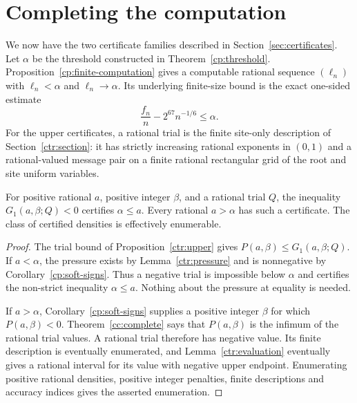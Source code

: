 \section{Completing the computation}\label{sec:assembly}

We now have the two certificate families described in
Section~\ref{sec:certificates}. Let $\alpha$ be the threshold constructed
in Theorem~\ref{cp:threshold}. Proposition~\ref{cp:finite-computation}
gives a computable rational sequence $(\ell_n)$ with
$\ell_n<\alpha$ and $\ell_n\to\alpha$. Its underlying finite-size bound
is the exact one-sided estimate
\[
 \frac{f_n}{n}-2^{67}n^{-1/6}\le\alpha.
\]
For the upper certificates, a rational trial is the finite site-only
description of Section~\ref{ctr:section}: it has strictly increasing
rational exponents in $(0,1)$ and a rational-valued message pair on a
finite rational rectangular grid of the root and site uniform variables.

\begin{lemma}\label{assembly:upper}
For positive rational $a$, positive integer $\beta$, and a rational trial
$Q$, the inequality $G_1(a,\beta;Q)<0$ certifies $\alpha\le a$.
Every rational $a>\alpha$ has such a certificate. The class of certified
densities is effectively enumerable.
\end{lemma}

\begin{proof}
The trial bound of Proposition~\ref{ctr:upper} gives
$P(a,\beta)\le G_1(a,\beta;Q)$. If $a<\alpha$, the pressure exists by
Lemma~\ref{ctr:pressure} and is nonnegative by Corollary~\ref{cp:soft-signs}.
Thus a negative trial is impossible below $\alpha$ and certifies the
non-strict inequality $\alpha\le a$. Nothing about the pressure at
equality is needed.

If $a>\alpha$, Corollary~\ref{cp:soft-signs} supplies a positive integer
$\beta$ for which $P(a,\beta)<0$. Theorem~\ref{cc:complete} says that
$P(a,\beta)$ is the infimum of the rational trial values. A rational
trial therefore has negative value. Its finite description is eventually
enumerated, and Lemma~\ref{ctr:evaluation} eventually gives a rational
interval for its value with negative upper endpoint. Enumerating positive
rational densities, positive integer penalties, finite descriptions and
accuracy indices gives the asserted enumeration.
\end{proof}

